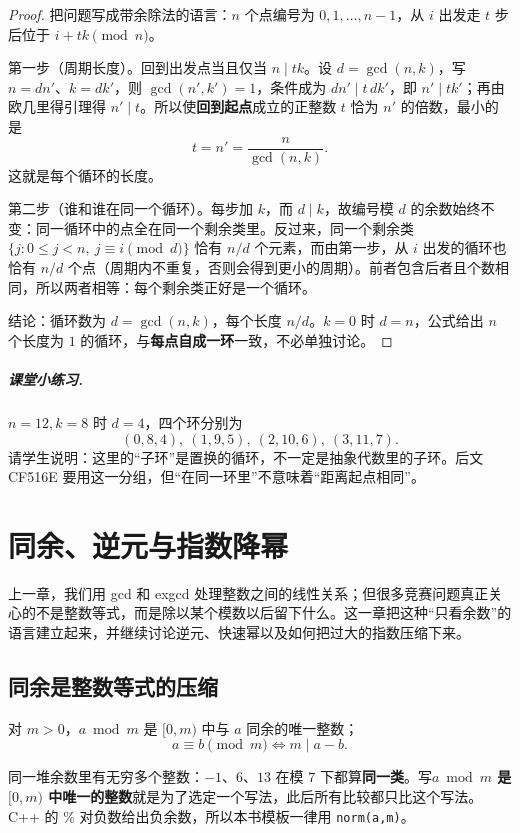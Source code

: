 \begin{proof}
把问题写成带余除法的语言：$n$ 个点编号为 $0,1,\ldots,n-1$，从 $i$ 出发走 $t$ 步后位于 $i+tk\pmod n$。

第一步（周期长度）。回到出发点当且仅当 $n\mid tk$。设 $d=\gcd(n,k)$，写 $n=dn'$、$k=dk'$，则 $\gcd(n',k')=1$，条件成为 $dn'\mid t\,dk'$，即 $n'\mid tk'$；再由欧几里得引理得 $n'\mid t$。所以使\textbf{回到起点}成立的正整数 $t$ 恰为 $n'$ 的倍数，最小的是
\[
 t=n'=\frac{n}{\gcd(n,k)}.
\]
这就是每个循环的长度。

第二步（谁和谁在同一个循环）。每步加 $k$，而 $d\mid k$，故编号模 $d$ 的余数始终不变：同一循环中的点全在同一个剩余类里。反过来，同一个剩余类 $\{j:0\le j<n,\ j\equiv i\pmod d\}$ 恰有 $n/d$ 个元素，而由第一步，从 $i$ 出发的循环也恰有 $n/d$ 个点（周期内不重复，否则会得到更小的周期）。前者包含后者且个数相同，所以两者相等：每个剩余类正好是一个循环。

结论：循环数为 $d=\gcd(n,k)$，每个长度 $n/d$。$k=0$ 时 $d=n$，公式给出 $n$ 个长度为 $1$ 的循环，与\textbf{每点自成一环}一致，不必单独讨论。
\end{proof}

\paragraph{课堂小练习.} $n=12,k=8$ 时 $d=4$，四个环分别为
\[
 (0,8,4),\ (1,9,5),\ (2,10,6),\ (3,11,7).
\]
请学生说明：这里的“子环”是置换的循环，不一定是抽象代数里的子环。后文 CF516E 要用这一分组，但“在同一环里”不意味着“距离起点相同”。



\chapter{同余、逆元与指数降幂}
\begin{chapterintro}[章节导读]
上一章，我们用 gcd 和 exgcd 处理整数之间的线性关系；但很多竞赛问题真正关心的不是整数等式，而是除以某个模数以后留下什么。这一章把这种“只看余数”的语言建立起来，并继续讨论逆元、快速幂以及如何把过大的指数压缩下来。
\end{chapterintro}

\section{同余是整数等式的压缩}
对 $m>0$，$a\bmod m$ 是 $[0,m)$ 中与 $a$ 同余的唯一整数；
\[
 a\equiv b\pmod m\iff m\mid a-b.
\]

\begin{tip}
同一堆余数里有无穷多个整数：$-1$、$6$、$13$ 在模 $7$ 下都算\textbf{同一类}。写\textbf{$a\bmod m$ 是 $[0,m)$ 中唯一的整数}就是为了选定一个写法，此后所有比较都只比这个写法。C++ 的 \% 对负数给出负余数，所以本书模板一律用 \texttt{norm(a,m)}。
\end{tip}

